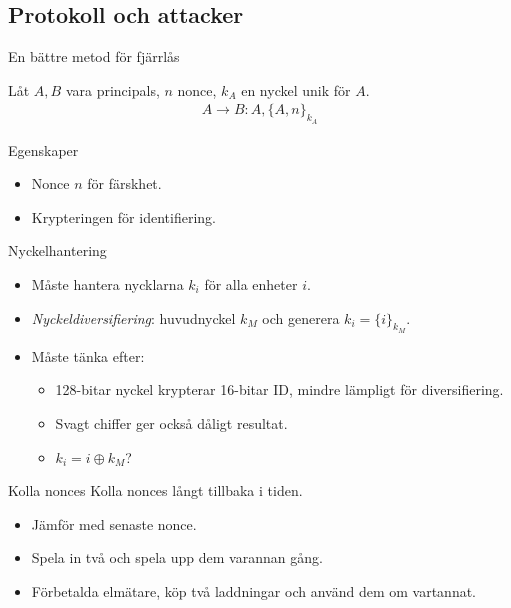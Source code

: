 \documentclass{beamer}
\DeclareMathOperator{\xor}{\oplus}
\newcommand{\encrypt}[2]{\{#1\}_{#2}}
\begin{document}
\subsection{Protokoll och attacker}

\begin{frame}{\insertsubsectionhead}{En bättre metod för fjärrlås}
  \begin{example}[Fjärrlås]
    Låt \(A, B\) vara principals, \(n\) nonce, \(k_A\) en nyckel unik för 
    \(A\).
    \begin{align*}
      A\to B\colon A, \encrypt{A, n}{k_A}
    \end{align*}
  \end{example}
  \begin{block}{Egenskaper}
    \begin{itemize}
      \item Nonce \(n\) för färskhet.
      \item Krypteringen för identifiering.
    \end{itemize}
  \end{block}
\end{frame}

\begin{frame}{\insertsubsectionhead}{Nyckelhantering}
  \begin{itemize}
    \item Måste hantera nycklarna \(k_i\) för alla enheter \(i\).
    \item \emph{Nyckeldiversifiering}: huvudnyckel \(k_M\) och generera \(k_i 
      = \encrypt{i}{k_M}\).
    \item Måste tänka efter:
      \begin{itemize}
        \item 128-bitar nyckel krypterar 16-bitar ID, mindre lämpligt för 
          diversifiering.
        \item Svagt chiffer ger också dåligt resultat.
        \item \(k_i = i\xor k_M\)?
      \end{itemize}
  \end{itemize}
\end{frame}

\begin{frame}{\insertsubsectionhead}{Kolla nonces}
  Kolla nonces långt tillbaka i tiden.
  \begin{itemize}
    \item Jämför med senaste nonce.
    \item Spela in två och spela upp dem varannan gång.
    \item Förbetalda elmätare, köp två laddningar och använd dem om vartannat.
  \end{itemize}
\end{frame}
\end{document}
